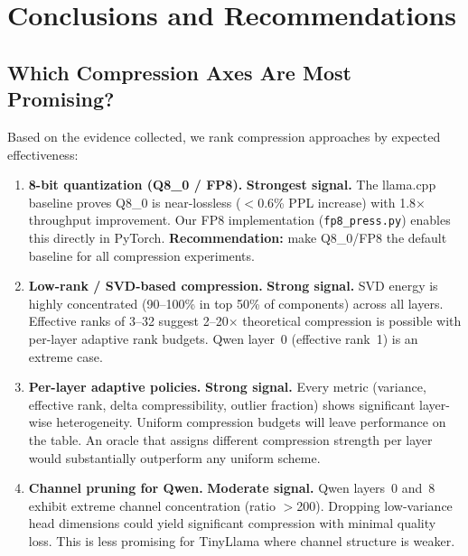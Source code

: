 \documentclass[11pt,a4paper]{article}
\begin{document}
\section{Conclusions and Recommendations}

\subsection{Which Compression Axes Are Most Promising?}

Based on the evidence collected, we rank compression approaches by
expected effectiveness:

\begin{enumerate}[itemsep=4pt]
  \item \textbf{8-bit quantization (Q8\_0 / FP8).} \textbf{Strongest
        signal.} The llama.cpp baseline proves Q8\_0 is near-lossless
        ($<$0.6\% PPL increase) with 1.8$\times$ throughput improvement.
        Our FP8 implementation (\texttt{fp8\_press.py}) enables this
        directly in PyTorch. \textbf{Recommendation:} make Q8\_0/FP8 the
        default baseline for all compression experiments.

  \item \textbf{Low-rank / SVD-based compression.} \textbf{Strong
        signal.} SVD energy is highly concentrated (90--100\% in top
        50\% of components) across all layers. Effective ranks of 3--32
        suggest 2--20$\times$ theoretical compression is possible with
        per-layer adaptive rank budgets. Qwen layer~0 (effective rank~1)
        is an extreme case.

  \item \textbf{Per-layer adaptive policies.} \textbf{Strong signal.}
        Every metric (variance, effective rank, delta compressibility,
        outlier fraction) shows significant layer-wise heterogeneity.
        Uniform compression budgets will leave performance on the table.
        An oracle that assigns different compression strength per layer
        would substantially outperform any uniform scheme.

  \item \textbf{Channel pruning for Qwen.} \textbf{Moderate signal.}
        Qwen layers~0 and~8 exhibit extreme channel concentration
        (ratio $>$200). Dropping low-variance head dimensions could
        yield significant compression with minimal quality loss. This
        is less promising for TinyLlama where channel structure is
        weaker.


\end{enumerate}
\end{document}
